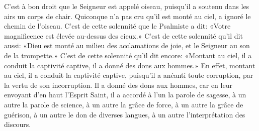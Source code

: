 C’est à bon droit que le Seigneur est appelé oiseau,
	puisqu’il a soutenu dans les airs un corps de chair.
Quiconque n’a pas cru qu’il est monté au ciel,
	a ignoré le chemin de l’oiseau.
C’est de cette solennité que le Psalmiste a dit:
	«Votre magnificence est élevée au-dessus des cieux.»
C’est de cette solennité qu’il dit aussi:
	«Dieu est monté au milieu des acclamations de joie,
	et le Seigneur au son de la trompette.»
C’est de cette solennité qu’il dit encore:
	«Montant au ciel, il a conduit la captivité captive,
	il a donné des dons aux hommes.»
En effet, montant au ciel, il a conduit la captivité captive,
	puisqu’il a anéanti toute corruption, par la vertu de son incorruption.
Il a donné des dons aux hommes, car en leur envoyant d’en haut l’Esprit Saint,
	il a accordé à l’un la parole de sagesse,
	à un autre la parole de science,
	à un autre la grâce de force,
	à un autre la grâce de guérison,
	à un autre le don de diverses langues,
	à un autre l’interprétation des discours.
